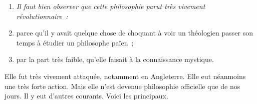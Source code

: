 \documentclass[french,twoside]{book} %
\newlength{\listmod}
\newcommand{\listhead}[1]{\hspace{-1\listmod}\emph{#1}}
\begin{document}
\begin{enumerate}[itemsep=0pt,]
\item[]\listhead{Il faut bien observer que cette philosophie parut très vivement révolutionnaire :}
\item parce qu’il y avait quelque chose de choquant à voir un théologien passer son temps à étudier un philosophe païen ;
\label{p121}\item par la part très faible, qu’elle faisait à la connaissance mystique.
\end{enumerate}

\noindent Elle fut très vivement attaquée, notamment en Angleterre. Elle eut néanmoins une très forte action. Mais elle n’est devenue philosophie officielle que de nos jours. Il y eut d’autres courants. Voici les principaux.\par
\end{document}

